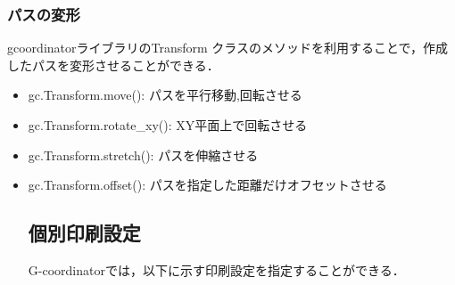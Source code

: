 \documentclass{article}
\begin{document}
\begin{twocolumn}
\subsubsection{パスの変形}
gcoordinatorライブラリのTransform クラスのメソッドを利用することで，作成したパスを変形させることができる．
\begin{itemize}
  \item gc.Transform.move(): パスを平行移動,回転させる
  \item gc.Transform.rotate\_xy(): XY平面上で回転させる
  \item gc.Transform.stretch(): パスを伸縮させる
  \item gc.Transform.offset():  パスを指定した距離だけオフセットさせる

\subsection{個別印刷設定} 
\label{sec:IndividualSettings}
G-coordinatorでは，以下に示す印刷設定を指定することができる．


\end{itemize}
\end{twocolumn}
\end{document}
